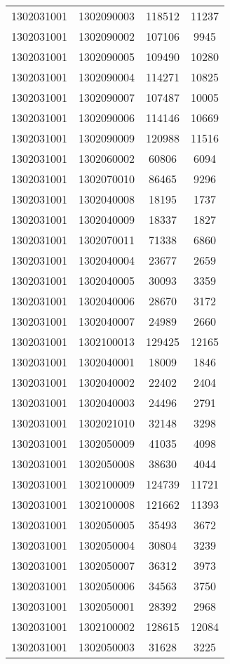 \begin{longtable}[h]{llcc}
		1302031001 & 1302090003 & 118512 & 11237\\
		1302031001 & 1302090002 & 107106 & 9945\\
		1302031001 & 1302090005 & 109490 & 10280\\
		1302031001 & 1302090004 & 114271 & 10825\\
		1302031001 & 1302090007 & 107487 & 10005\\
		1302031001 & 1302090006 & 114146 & 10669\\
		1302031001 & 1302090009 & 120988 & 11516\\
		1302031001 & 1302060002 & 60806 & 6094\\
		1302031001 & 1302070010 & 86465 & 9296\\
		1302031001 & 1302040008 & 18195 & 1737\\
		1302031001 & 1302040009 & 18337 & 1827\\
		1302031001 & 1302070011 & 71338 & 6860\\
		1302031001 & 1302040004 & 23677 & 2659\\
		1302031001 & 1302040005 & 30093 & 3359\\
		1302031001 & 1302040006 & 28670 & 3172\\
		1302031001 & 1302040007 & 24989 & 2660\\
		1302031001 & 1302100013 & 129425 & 12165\\
		1302031001 & 1302040001 & 18009 & 1846\\
		1302031001 & 1302040002 & 22402 & 2404\\
		1302031001 & 1302040003 & 24496 & 2791\\
		1302031001 & 1302021010 & 32148 & 3298\\
		1302031001 & 1302050009 & 41035 & 4098\\
		1302031001 & 1302050008 & 38630 & 4044\\
		1302031001 & 1302100009 & 124739 & 11721\\
		1302031001 & 1302100008 & 121662 & 11393\\
		1302031001 & 1302050005 & 35493 & 3672\\
		1302031001 & 1302050004 & 30804 & 3239\\
		1302031001 & 1302050007 & 36312 & 3973\\
		1302031001 & 1302050006 & 34563 & 3750\\
		1302031001 & 1302050001 & 28392 & 2968\\
		1302031001 & 1302100002 & 128615 & 12084\\
		1302031001 & 1302050003 & 31628 & 3225\\

\end{longtable}
